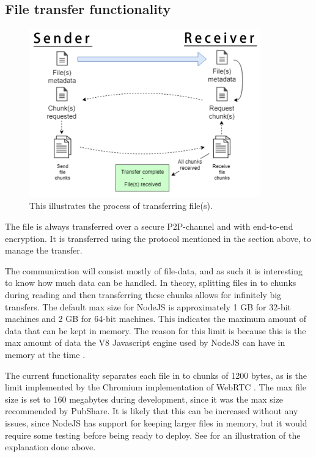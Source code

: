 	\subsection{File transfer functionality}
		\begin{figure}[th]
		  \centering
		  \includegraphics[width=100mm]{Figures/File_share_protocol}
		  \decoRule
		  \caption[File sharing process]{This illustrates the process of transferring file(s).}
		  \label{fig:file_off}
		\end{figure}

		The file is always transferred over a secure P2P-channel and with end-to-end encryption. It is transferred using the protocol mentioned in the section above, to manage the transfer.

		The communication will consist mostly of file-data, and as such it is interesting to know how much data can be handled. In theory, splitting files in to chunks during reading and then transferring these chunks allows for infinitely big transfers. The default max size for NodeJS is approximately 1 GB for 32-bit machines and 2 GB for 64-bit machines. This indicates the maximum amount of data that can be kept in memory. The reason for this limit is because this is the max amount of data the V8 Javascript engine used by NodeJS can have in memory at the time \cite{url_node,url_v8}.

		The current functionality separates each file in to chunks of 1200 bytes, as is the limit implemented by the Chromium implementation of WebRTC \cite{SctptransportCcCode}. The max file size is set to 160 megabytes during development, since it was the max size recommended by PubShare. It is likely that this can be increased without any issues, since NodeJS has support for keeping larger files in memory, but it would require some testing before being ready to deploy. See  for an illustration of the explanation done above.

